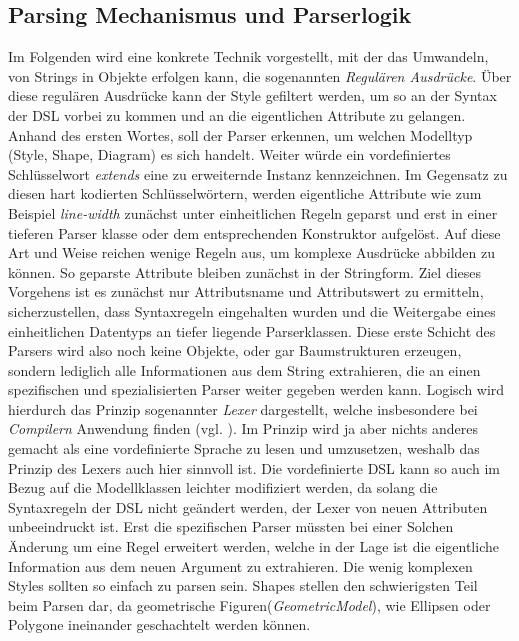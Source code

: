 \subsection{Parsing Mechanismus und Parserlogik}\label{ansatzlexer}Im Folgenden wird eine konkrete Technik vorgestellt, mit der das Umwandeln, von Strings in Objekte erfolgen kann,
die sogenannten \textit{Regulären Ausdrücke}. Über diese regulären Ausdrücke kann der Style gefiltert werden, um so an der Syntax der DSL vorbei zu kommen und an die eigentlichen Attribute zu gelangen.
Anhand des ersten Wortes, soll der Parser erkennen, um welchen Modelltyp (Style, Shape, Diagram) es sich handelt. 
Weiter würde ein vordefiniertes Schlüsselwort \textit{extends} eine zu erweiternde Instanz kennzeichnen.
Im Gegensatz zu diesen hart kodierten Schlüsselwörtern, werden eigentliche Attribute wie zum Beispiel \textit{line-width} zunächst unter einheitlichen Regeln geparst
und erst in einer tieferen Parser klasse oder dem entsprechenden Konstruktor aufgelöst. Auf diese Art und Weise reichen wenige Regeln aus, um komplexe Ausdrücke abbilden zu können. So geparste Attribute bleiben zunächst in der Stringform. Ziel dieses Vorgehens ist es zunächst nur Attributsname und Attributswert zu ermitteln, sicherzustellen, dass Syntaxregeln eingehalten wurden und die Weitergabe eines einheitlichen Datentyps an tiefer liegende Parserklassen. Diese erste Schicht des Parsers wird also noch keine Objekte, oder gar Baumstrukturen erzeugen, sondern lediglich alle Informationen aus dem String extrahieren, die an einen spezifischen und spezialisierten Parser weiter gegeben werden kann.
Logisch wird hierdurch das Prinzip sogenannter \textit{Lexer} dargestellt, welche insbesondere bei \textit{Compilern} Anwendung finden (vgl. ). Im Prinzip wird ja aber nichts anderes gemacht als eine vordefinierte Sprache zu lesen und umzusetzen, weshalb das Prinzip des Lexers auch hier sinnvoll ist.
Die vordefinierte DSL kann so auch im Bezug auf die Modellklassen leichter modifiziert werden, da solang die Syntaxregeln der DSL nicht geändert werden, der Lexer von neuen Attributen unbeeindruckt ist. Erst die spezifischen Parser müssten bei einer Solchen Änderung um eine Regel erweitert werden, welche in der Lage ist die eigentliche Information aus dem neuen Argument zu extrahieren.
Die wenig komplexen Styles sollten so einfach zu parsen sein. Shapes stellen den schwierigsten Teil beim Parsen dar, da geometrische Figuren(\textit{GeometricModel}), wie Ellipsen oder Polygone ineinander geschachtelt werden können.
